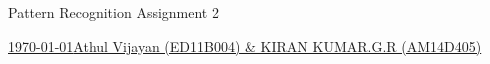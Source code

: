 \documentclass[11pt,paper=a4,answers]{exam}
\begin{document}
\noindent
\begin{minipage}[l]{.1\textwidth}%
\noindent
\end{minipage}
\hfill
\begin{minipage}[r]{.68\textwidth}%
\begin{center}
{\large \bfseries \par
\Large Pattern Recognition Assignment 2 \\[2pt]
\small   \par}
\end{center}
\end{minipage}
\begin{minipage}[l]{.195\textwidth}%
\noindent
{\footnotesize}
\end{minipage}
\par
\noindent
\uline{\today \hfill \normalsize\emph \hfill       Athul Vijayan (ED11B004) \& KIRAN KUMAR.G.R (AM14D405)}\\
\end{document}
